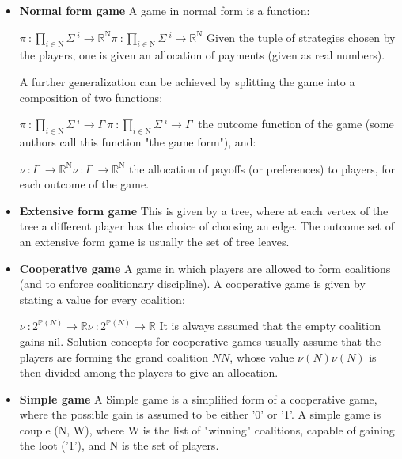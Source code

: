 \documentclass[]{report}
\begin{document}
\begin{itemize}
	\item \textbf{Normal form game}
	A game in normal form is a function:
	
	${\displaystyle \pi \ :\prod _{i\in \mathrm {N} }\Sigma \ ^{i}\to \mathbb {R} ^{\mathrm {N} }} \pi \ :\prod _{i\in \mathrm {N} }\Sigma \ ^{i}\to \mathbb {R} ^{\mathrm {N} }$
	Given the tuple of strategies chosen by the players, one is given an allocation of payments (given as real numbers).
	
	A further generalization can be achieved by splitting the game into a composition of two functions:
	
	${\displaystyle \pi \ :\prod _{i\in \mathrm {N} }\Sigma \ ^{i}\to \Gamma \ } \pi \ :\prod _{i\in \mathrm {N} }\Sigma \ ^{i}\to \Gamma \ $
	the outcome function of the game (some authors call this function "the game form"), and:
	
	${\displaystyle \nu \ :\Gamma \ \to \mathbb {R} ^{\mathrm {N} }} \nu \ :\Gamma \ \to \mathbb {R} ^{\mathrm {N} }$
	the allocation of payoffs (or preferences) to players, for each outcome of the game.
	
	\item \textbf{Extensive form game}
	This is given by a tree, where at each vertex of the tree a different player has the choice of choosing an edge. The outcome set of an extensive form game is usually the set of tree leaves.
	
	\item \textbf{Cooperative game}
	A game in which players are allowed to form coalitions (and to enforce coalitionary discipline). A cooperative game is given by stating a value for every coalition:
	
	${\displaystyle \nu \ :2^{\mathbb {P} (N)}\to \mathbb {R} } \nu \ :2^{\mathbb {P} (N)}\to \mathbb {R} $
	It is always assumed that the empty coalition gains nil. Solution concepts for cooperative games usually assume that the players are forming the grand coalition ${\displaystyle N} N$, whose value ${\displaystyle \nu (N)} \nu (N) $ is then divided among the players to give an allocation.
	
	\item \textbf{Simple game}
	A Simple game is a simplified form of a cooperative game, where the possible gain is assumed to be either '0' or '1'. A simple game is couple (N, W), where W is the list of "winning" coalitions, capable of gaining the loot ('1'), and N is the set of players.
	

\end{itemize}
\end{document}
